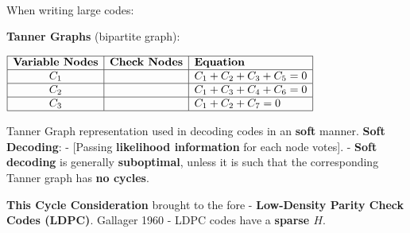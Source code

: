 \documentclass[11pt]{article}
\newcommand{\prompt}[4]{
        {\ttfamily\llap{{\color{#2}[#3]:\hspace{3pt}#4}}\vspace{-\baselineskip}}
    }
\begin{document}
            
\prompt{Out}{outcolor}{13}{}
    
    \begin{center}
    \end{center}
    { \hspace*{\fill} \\}
    

    When writing large codes:

\textbf{Tanner Graphs} (bipartite graph):

\(\begin{array}{|c|c|l|} \hline \textbf{Variable Nodes} & \textbf{Check Nodes} & \textbf{Equation} \\ \hline C_1                     &                       & C_1 + C_2 + C_3 + C_5 = 0 \\ \hline C_2                     &                       & C_1 + C_3 + C_4 + C_6 = 0 \\ \hline C_3                     &                       & C_1 + C_2 + C_7 = 0 \\ \hline \end{array}\)

Tanner Graph representation used in decoding codes in an \textbf{soft}
manner. \textbf{Soft Decoding}: - {[}Passing \textbf{likelihood
information} for each node votes{]}. - \textbf{Soft decoding} is
generally \textbf{suboptimal}, unless it is such that the corresponding
Tanner graph has \textbf{no cycles}.

\textbf{This Cycle Consideration} brought to the fore -
\textbf{Low-Density Parity Check Codes (LDPC)}. Gallager 1960 - LDPC
codes have a \textbf{sparse \(H\)}.
\end{document}
